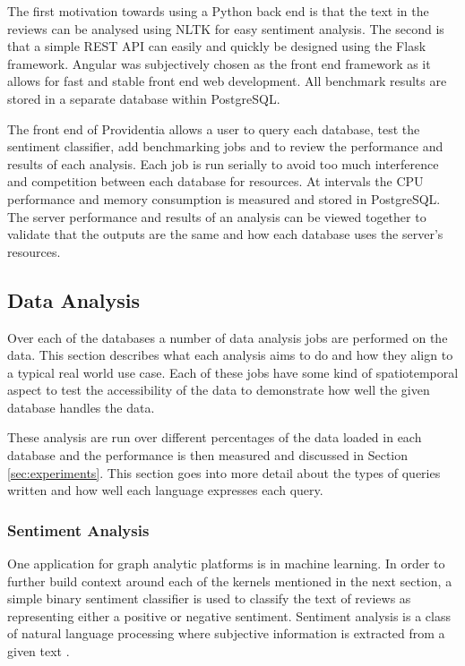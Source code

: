 The first motivation towards using a Python back end is that the text in the reviews can be analysed using NLTK for easy sentiment analysis. The second is that a simple REST API can easily and quickly be designed using the Flask framework. Angular was subjectively chosen as the front end framework as it allows for fast and stable front end web development. All benchmark results are stored in a separate database within PostgreSQL.

The front end of Providentia allows a user to query each database, test the sentiment classifier, add benchmarking jobs and to review the performance and results of each analysis. Each job is run serially to avoid too much interference and competition between each database for resources. At intervals the CPU performance and memory consumption is measured and stored in PostgreSQL. The server performance and results of an analysis can be viewed together to validate that the outputs are the same and how each database uses the server's resources.

\subsection{Data Analysis}
Over each of the databases a number of data analysis jobs are performed on the data. This section describes what each analysis aims to do and how they align to a typical real world use case. Each of these jobs have some kind of spatiotemporal aspect to test the accessibility of the data to demonstrate how well the given database handles the data.

These analysis are run over different percentages of the data loaded in each database and the performance is then measured and discussed in Section \ref{sec:experiments}. This section goes into more detail about the types of queries written and how well each language expresses each
query.

\subsubsection{Sentiment Analysis}
One application for graph analytic platforms is in machine learning. In order to further build context around each of the kernels mentioned in the next section, a simple binary sentiment classifier is used to classify the text of reviews as representing either a positive or negative sentiment. Sentiment analysis is a class of natural language processing where subjective information is extracted from a given text \cite{sentiment-analysis-gupta}.

